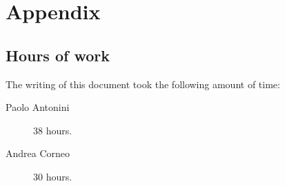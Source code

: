 \chapter{Appendix}\label{chap:appendix}

\section{Hours of work}
The writing of this document took the following amount of time:

\begin{description}
	\item [Paolo Antonini] 38 hours.
	\item [Andrea Corneo] 30 hours.
\end{description}

